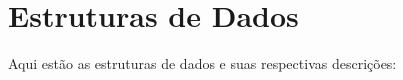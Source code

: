 \section{Estruturas de Dados}
Aqui estão as estruturas de dados e suas respectivas descrições:\begin{CompactList}
\item{}
\end{CompactList}
